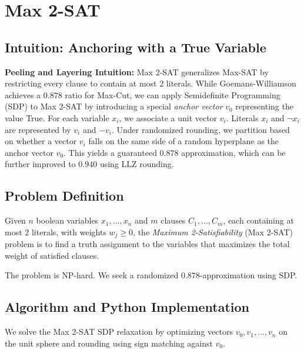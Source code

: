 \documentclass[11pt,oneside]{book}
\begin{document}
\setcounter{chapter}{25}
\chapter{Max 2-SAT}
\label{ch:max_2sat}

\section{Intuition: Anchoring with a True Variable}

\begin{intuitionbox}
\textbf{Peeling and Layering Intuition:} Max 2-SAT generalizes Max-SAT by restricting every clause to contain at most 2 literals. While Goemans-Williamson achieves a $0.878$ ratio for Max-Cut, we can apply Semidefinite Programming (SDP) to Max 2-SAT by introducing a special \emph{anchor vector} $v_0$ representing the value True. For each variable $x_i$, we associate a unit vector $v_i$. Literals $x_i$ and $\neg x_i$ are represented by $v_i$ and $-v_i$. Under randomized rounding, we partition based on whether a vector $v_i$ falls on the same side of a random hyperplane as the anchor vector $v_0$. This yields a guaranteed $0.878$ approximation, which can be further improved to $0.940$ using LLZ rounding.
\end{intuitionbox}

\section{Problem Definition}
Given $n$ boolean variables $x_1, \dots, x_n$ and $m$ clauses $C_1, \dots, C_m$, each containing at most 2 literals, with weights $w_j \ge 0$, the \emph{Maximum 2-Satisfiability} (Max 2-SAT) problem is to find a truth assignment to the variables that maximizes the total weight of satisfied clauses.

The problem is NP-hard. We seek a randomized $0.878$-approximation using SDP.

\section{Algorithm and Python Implementation}
We solve the Max 2-SAT SDP relaxation by optimizing vectors $v_0, v_1, \dots, v_n$ on the unit sphere and rounding using sign matching against $v_0$.
\end{document}
